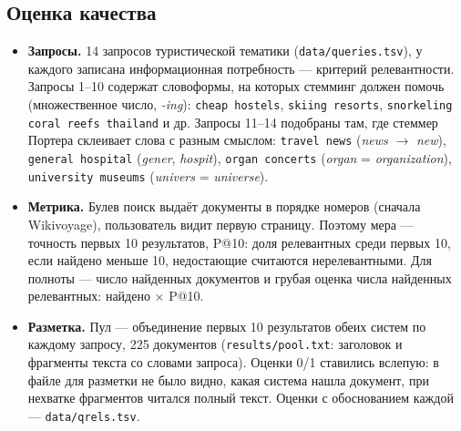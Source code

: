 \subsection{Оценка качества}
\begin{itemize}
    \item \textbf{Запросы.} 14 запросов туристической тематики (\texttt{data/queries.tsv}), у каждого записана информационная потребность --- критерий релевантности. Запросы 1--10 содержат словоформы, на которых стемминг должен помочь (множественное число, \emph{-ing}): \texttt{cheap hostels}, \texttt{skiing resorts}, \texttt{snorkeling coral reefs thailand} и др. Запросы 11--14 подобраны там, где стеммер Портера склеивает слова с разным смыслом: \texttt{travel news} (\emph{news} $\to$ \emph{new}), \texttt{general hospital} (\emph{gener}, \emph{hospit}), \texttt{organ concerts} (\emph{organ} = \emph{organization}), \texttt{university museums} (\emph{univers} = \emph{universe}).
    \item \textbf{Метрика.} Булев поиск выдаёт документы в порядке номеров (сначала Wikivoyage), пользователь видит первую страницу. Поэтому мера --- точность первых 10 результатов, P@10: доля релевантных среди первых 10, если найдено меньше 10, недостающие считаются нерелевантными. Для полноты --- число найденных документов и грубая оценка числа найденных релевантных: найдено $\times$ P@10.
    \item \textbf{Разметка.} Пул --- объединение первых 10 результатов обеих систем по каждому запросу, 225 документов (\texttt{results/pool.txt}: заголовок и фрагменты текста со словами запроса). Оценки 0/1 ставились вслепую: в файле для разметки не было видно, какая система нашла документ, при нехватке фрагментов читался полный текст. Оценки с обоснованием каждой --- \texttt{data/qrels.tsv}.
\end{itemize}
